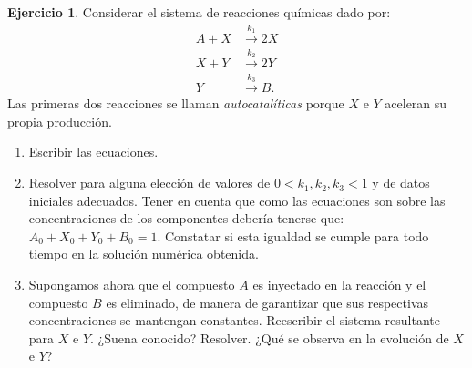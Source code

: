 \documentclass[12pt, a4paper]{amsbook}
\theoremstyle{remark}
\theoremstyle{definition}
\newtheorem{ejer}[teo]{Ejercicio}
\numberwithin{section}{chapter}
\numberwithin{subsection}{section}
\numberwithin{equation}{section}
\numberwithin{figure}{chapter}
\begin{document}
\begin{ejer}
    Considerar el sistema de reacciones químicas dado por:
    \begin{align*}
        A + X&\xrightarrow{k_1} 2X \\
        X + Y&\xrightarrow{k_2} 2Y \\
        Y &\xrightarrow{k_3} B.
    \end{align*}
    Las primeras dos reacciones se llaman \emph{autocatalíticas} porque $X$ e $Y$ aceleran su propia producción. 
    \begin{enumerate}
        \item Escribir las ecuaciones.
        \item Resolver para alguna elección de valores de $0<k_1,k_2,k_3<1$ y de datos iniciales adecuados. Tener en cuenta que como las ecuaciones son sobre las concentraciones de los componentes debería tenerse que: $A_0+X_0+Y_0+B_0=1$. Constatar si esta igualdad se cumple para todo tiempo en la solución numérica obtenida.
        \item Supongamos ahora que el compuesto $A$ es inyectado en la reacción y el compuesto $B$ es eliminado, de manera de garantizar que sus respectivas concentraciones se mantengan constantes. Reescribir el sistema resultante para $X$ e $Y$. ¿Suena conocido? Resolver. ¿Qué se observa en la evolución de $X$ e $Y$?
    \end{enumerate}
\end{ejer}
\end{document}
